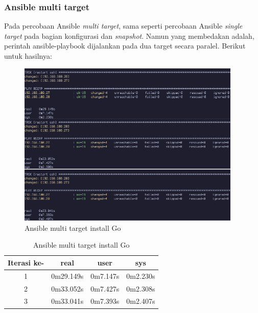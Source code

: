 \documentclass[10pt,twoside]{report}
\begin{document}
\begin{adjustwidth}{20pt}{}
	\subsubsection{Ansible multi target}
	\begin{adjustwidth}{20pt}{}
		Pada percobaan Ansible \textit{multi target}, sama seperti percobaan Ansible \textit{single target}
		pada bagian konfigurasi dan \textit{snapshot}. Namun yang membedakan adalah, perintah
		ansible-playbook dijalankan pada dua target secara paralel. Berikut untuk hasilnya:
	\end{adjustwidth}
	\begin{figure}[H]
		\begin{center}
			\includegraphics[width=0.95\textwidth]{images/ansible/multi/ansible-go-multi-com.png}
		\end{center}
		\caption{Ansible multi target install Go}
	\end{figure}

	\begin{table}[H]
		\caption{Ansible multi target install Go}
		\begin{center}
			\begin{tabular}[c]{|c|c|c|c|}
				\hline
				\multicolumn{1}{|c|}{\textbf{Iterasi ke-}} &
				\multicolumn{1}{c|}{\textbf{real}}         &
				\multicolumn{1}{c|}{\textbf{user}}         &
				\multicolumn{1}{c|}{\textbf{sys}}                                            \\
				\hline
				1                                          & 0m29.149s & 0m7.147s & 0m2.230s \\
				\hline
				2                                          & 0m33.052s & 0m7.427s & 0m2.308s \\
				\hline
				3                                          & 0m33.041s & 0m7.393s & 0m2.407s \\
				\hline
			\end{tabular}
		\end{center}
	\end{table}

\end{adjustwidth}
\end{document}
